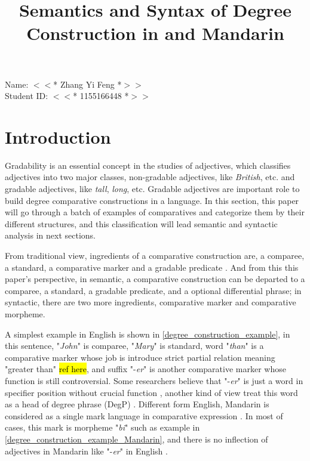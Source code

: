 \documentclass{ctexart}
\title{Semantics and Syntax of Degree Construction in and Mandarin}
\date{\vspace{-10ex}}
\let \cite \parencite
\begin{document}
\thispagestyle{empty} %

\begin{center}

Name: $<<$* Zhang Yi Feng *$>>$ \\
Student ID: $<<$* 1155166448 *$>>$

\end{center}

{\let\newpage\relax\maketitle}


\section{Introduction}

\setcounter{page}{1}

Gradability is an essential concept in the studies of adjectives, which classifies adjectives into two major classes, non-gradable adjectives, like \textit{British}, etc. and gradable adjectives, like \textit{tall}, \textit{long}, etc. Gradable adjectives are important role to build degree comparative constructions in a language. In this section, this paper will go through a batch of examples of comparatives and categorize them by their different structures, and this classification will lead semantic and syntactic analysis in next sections. 

From traditional view, ingredients of a comparative construction are, a comparee, a standard, a comparative marker and a gradable predicate \cite{guo2012}. And from this this paper's perspective, in semantic, a comparative construction can be departed to a comparee, a standard, a gradable predicate, and a optional differential phrase; in syntactic, there are two more ingredients, comparative marker and comparative morpheme.

A simplest example in English is shown in \ref{degree_construction_example}, in this sentence, "\textit{John}" is comparee, "\textit{Mary}" is standard, word "\textit{than}" is a comparative marker whose job is introduce strict partial relation meaning "greater than" \hl{ref here}, and suffix "-\textit{er}" is another comparative marker whose function is still controversial. Some researchers believe that "-\textit{er}" is just a word in specifier position without crucial function \cite{von1984a,heim1985,bhatt2004,rullmann1995}, another kind of view treat this word as a head of degree phrase (DegP) \cite{bierwisch1989,corver1990,corver1993,corver1997a,kennedy1997,grano2012}. Different form English, Mandarin is considered as a single mark language in comparative expression \cite{bobaljik2012,grano2012}. In most of cases, this mark is morpheme "\textit{bi}" such as example in \ref{degree_construction_example_Mandarin}, and there is no inflection of adjectives in Mandarin like "-\textit{er}" in English \cite{guo2012}. 
\end{document}
